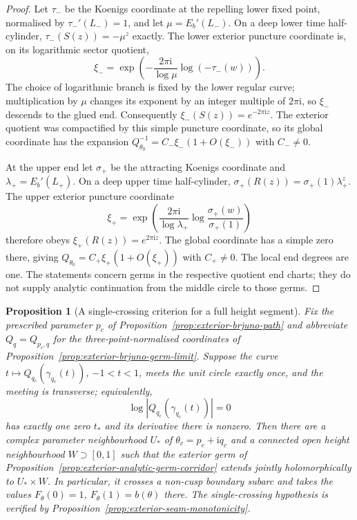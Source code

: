 \documentclass[11pt,a4paper]{article}
\newtheorem{proposition}[theorem]{Proposition}
\theoremstyle{definition}
\newcommand{\Rr}{R}
\newcommand{\ii}{\mathrm{i}}
\begin{document}
\begin{proof}
Let $\tau_-$ be the Koenigs coordinate at the repelling lower fixed
point, normalised by $\tau_-'(L_-)=1$, and let
$\mu=E_b'(L_-)$.  On a deep lower time half-cylinder,
$\tau_-(S(z))=-\mu^z$ exactly.  The lower exterior puncture
coordinate is, on its logarithmic sector quotient,
\[
 \xi_-=
 \exp\!\left(-\frac{2\pi\ii}{\log\mu}
                      \log(-\tau_-(w))\right).
\]
The choice of logarithmic branch is fixed by the lower regular
curve; multiplication by $\mu$ changes its exponent by an integer
multiple of $2\pi\ii$, so $\xi_-$ descends to the glued end.
Consequently $\xi_-(S(z))=e^{-2\pi\ii z}$.
The exterior quotient was compactified by this simple puncture
coordinate, so its global coordinate has the expansion
$Q_{\theta_0}^{-1}=C_-\xi_-(1+O(\xi_-))$ with $C_-\ne0$.

At the upper end let $\sigma_+$ be the attracting Koenigs
coordinate and $\lambda_+=E_b'(L_+)$.  On a deep upper time
half-cylinder,
$\sigma_+(\Rr(z))=\sigma_+(1)\lambda_+^z$.
The upper exterior puncture coordinate
\[
 \xi_+=\exp\!\left(\frac{2\pi\ii}{\log\lambda_+}
           \log\frac{\sigma_+(w)}{\sigma_+(1)}\right)
\]
therefore obeys $\xi_+(\Rr(z))=e^{2\pi\ii z}$.
The global coordinate has a simple zero there, giving
$Q_{\theta_0}=C_+\xi_+(1+O(\xi_+))$ with $C_+\ne0$.
The local end degrees are one.  The statements concern germs in
the respective quotient end charts; they do not supply analytic
continuation from the middle circle to those germs.
\end{proof}

\begin{proposition}[A single-crossing criterion for a full height segment]
\label{prop:exterior-single-crossing}
Fix the prescribed parameter $p_c$ of
Proposition~\ref{prop:exterior-brjuno-path} and abbreviate
$Q_q=Q_{p_c,q}$ for the three-point-normalised coordinates of
Proposition~\ref{prop:exterior-brjuno-germ-limit}.  Suppose the curve
$t\mapsto Q_{q_c}(\gamma_{q_c}(t))$, $-1<t<1$, meets the unit circle
exactly once, and the meeting is transverse; equivalently,
\[
 \log|Q_{q_c}(\gamma_{q_c}(t))|=0
\]
has exactly one zero $t_*$ and its derivative there is nonzero.
Then there are a complex parameter neighbourhood $U_*$ of
$\theta_c=p_c+\ii q_c$ and a connected open height neighbourhood
$W\supset[0,1]$ such that the exterior germ of
Proposition~\ref{prop:exterior-analytic-germ-corridor} extends
jointly holomorphically to $U_*\times W$.  In particular, it
crosses a non-cusp boundary subarc and takes the values
$F_\theta(0)=1$, $F_\theta(1)=b(\theta)$ there.  The
single-crossing hypothesis is verified by
Proposition~\ref{prop:exterior-seam-monotonicity}.
\end{proposition}
\end{document}
